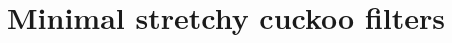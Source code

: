 \documentclass[letterpaper,twocolumn,10pt]{article}
\newcommand{\ints}{\mathbb{Z}}
\newcommand{\taffy}{stretchy}
\newcommand{\taffy}{taffy}
\begin{document}











\section{Minimal \taffy{} cuckoo filters}
\label{mtcf}
\end{document}
